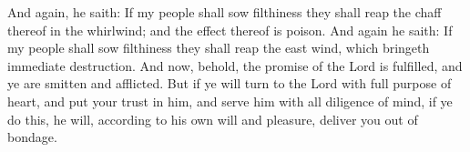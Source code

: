 And again, he saith: If my people shall sow filthiness they shall reap the chaff thereof in the whirlwind; and the effect thereof is poison.
\bverse \iffalse And again he saith: If my people shall sow filthiness they shall reap the east wind, which bringeth immediate destruction. \fi
And again he saith: If my people shall sow filthiness they shall reap the east wind, which bringeth immediate destruction.
\bverse \iffalse And now, behold, the promise of the Lord is fulfilled, and ye are smitten and afflicted. \fi
And now, behold, the promise of the Lord is fulfilled, and ye are smitten and afflicted.
\bverse \iffalse But if ye will turn to the Lord with full purpose of heart, and put your trust in him, and serve him with all diligence of mind, if ye do this, he will, according to his own will and pleasure, deliver you out of bondage. \fi
But if ye will turn to the Lord with full purpose of heart, and put your trust in him, and serve him with all diligence of mind, if ye do this, he will, according to his own will and pleasure, deliver you out of bondage.

